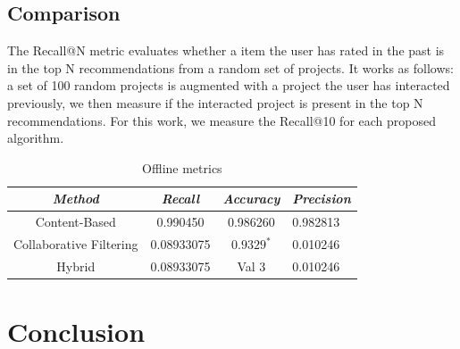 \documentclass[cic,tc,english]{iiufrgs}
\begin{document}
\section{Comparison}
The Recall@N metric evaluates whether a item the user has rated in the past is in the top N recommendations from a random set of projects. It works as follows: a set of 100 random projects is augmented with a project the user has interacted previously, we then measure if the interacted project is present in the top N recommendations. For this work, we measure the Recall@10 for each proposed algorithm.
\begin{table}[h]
    \caption{Offline metrics}
    \centering
        \begin{tabular}{c|c|c|p{5cm}}
          \hline
          \textit{Method}  &   \textit{Recall}  &   \textit{Accuracy}  &   \textit{Precision} \\
          \hline
          \hline
          Content-Based           &   0.990450           & 0.986260 &  0.982813 \\
          Collaborative Filtering     & 0.08933075             & $0.9329^*$  & 0.010246\\
          Hybrid     & 0.08933075             & Val 3  & 0.010246\\
          \hline
        \end{tabular}
    \label{tbl:offline_metrics}
\end{table}

\chapter{Conclusion}

% 


{}
\end{document}
